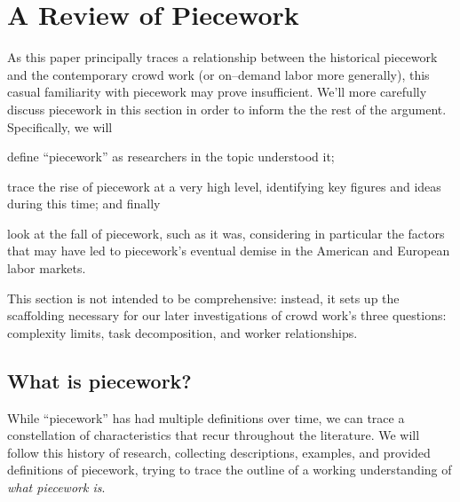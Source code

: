 \documentclass[trackingWork]{subfiles}
\begin{document}
\section{A Review of Piecework}

As this paper principally traces a relationship between
the historical piecework and the contemporary crowd work
(or on--demand labor more generally),
this casual familiarity with piecework may prove insufficient.
We'll more carefully discuss piecework in this section in order
to inform the the rest of the argument.
Specifically, we will
\begin{inlinelist}
  \item define ``piecework'' as researchers in the topic understood it;
  \item trace the rise of piecework at a very high level,
        identifying key figures and ideas during this time; and finally
  \item look at the fall of piecework, such as it was,
        considering in particular
        the factors that may have led to piecework's
        eventual demise in the American and European labor markets.
\end{inlinelist}
This section is not intended to be comprehensive: instead, it sets up the scaffolding necessary for our later investigations of crowd work's three questions: complexity limits, task decomposition, and worker relationships.



\subsection{What is piecework?}
While ``piecework'' has had multiple definitions over time,
we can trace a constellation of characteristics that recur throughout the literature.
We will follow this history of research, collecting
descriptions,
examples, and
provided definitions of piecework, trying
to trace the outline of a working understanding of
\textit{what piecework is}.
\end{document}
